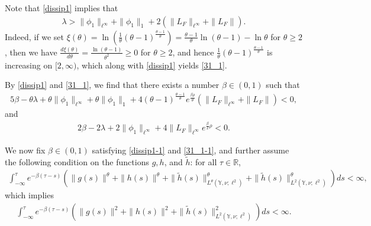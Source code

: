 \documentclass[11pt]{article}
\numberwithin{equation}{section}
\theoremstyle{plain}
\begin{document}
Note that \eqref{dissip1} implies  that 
 \begin{align}\label{31_1}
  \lambda > \|\phi_1\|_{\ell^\infty} 
             	    + \|\phi_1\|_1 
 	                + 2 \left( \|L_{F}\|_{\ell^\infty}
 	                                + \|L_F\|
 	                      \right).
 \end{align}  
 Indeed, if we set
   $\xi (\theta)
           =\ln 
               \left( \frac{1}{\theta} (\theta-1)^{\frac{\theta - 1}{\theta} } 
                \right) 
           = \frac{\theta - 1}{\theta} \ln(\theta -1) - \ln \theta
         $ 
 for $\theta \ge 2$,
 then   we have
    $ \frac{d \xi (\theta) }{d \theta} 
       = \frac{\ln(\theta-1) }{\theta^2} 
       \ge 0
    $ 
    for $\theta \ge 2$,
    and hence  
  $\frac{1}{\theta} (\theta-1)^{\frac{\theta - 1}{\theta} }$
 is   increasing on $  [2, \infty)$, which along with
  \eqref{dissip1} yields 
 \eqref{31_1}.
 
  
 
By \eqref{dissip1} and \eqref{31_1}, 
we find that 
  there exists a number $\beta \in (0,1)$ such that
 \begin{align}\label{dissip1-1}
   5 \beta - \theta \lambda
 	            + \theta \|\phi_1\|_{\ell^\infty}
 	            + \theta \|\phi_1\|_{1}
 	            + 4(\theta-1)^{\frac{\theta - 1}{\theta} } 
 	                      e^{\frac{\beta \rho}{\theta} }
 	          	                \left( \|L_{F}\|_{\ell^\infty} + \|L_F\|
 	          	                \right) 
    < 0,
 \end{align}
 and 
  {
 \begin{align}\label{31_1-1}     
      2\beta - 2\lambda 
                  + 2\|\phi_1\|_{\ell^\infty} 
                  + 4 \|L_{F}\|_{\ell^\infty} e^{\frac{\beta}{2} \rho}
	   < 0.
 \end{align}
}

 We now fix $\beta \in (0,1)$ satisfying \eqref{dissip1-1} and \eqref{31_1-1}, and further assume the following condition on the functions  $g, h$, and $\widetilde{h}$:
 for  all  $\tau \in \mathbb{R}$,
 \begin{align}\label{dissip2}
    \int_{-\infty}^{\tau}
          e^{- \beta (\tau - s) }
          \left( \|g(s)\|^{\theta} + \|h(s)\|^{\theta}
                    + \|\widetilde{h}(s)\|^{\theta}_{L^{ \theta}(\mathbb{Y}, \nu; \ell^2)}
                  + \|\widetilde{h}(s)\|^{\theta}_{L^{ 2}(\mathbb{Y}, \nu; \ell^2)}   
          \right) ds
    <   \infty,
 \end{align}
which implies 
\begin{align}\label{34_1}
	\int_{-\infty}^{\tau} 
	         e^{- \beta(\tau - s )} 
	         \left( \|g(s)\|^2 + \|h(s)\|^2 
	                  + \|\widetilde{h}(s)\|^2 _{L^2(\mathbb{Y}, \nu; \ell^2)} 
	         \right) ds 
	  < \infty.
\end{align}
\end{document}
